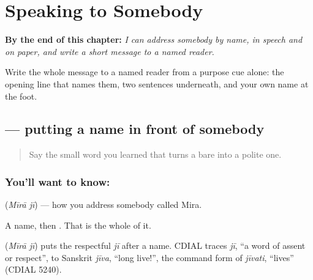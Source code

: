 
\chapter{Speaking to Somebody}
\label{ch:hi-sambodhan}

\begin{chapteropening}
\textbf{By the end of this chapter:} \emph{I can address somebody by name, in speech and on paper, and write a short message to a named reader.}

Write the whole message to a named reader from a purpose cue alone: the opening line that names them, two sentences underneath, and your own name at the foot.
\end{chapteropening}

\section[\texorpdfstring{\hi{मीरा} \hi{जी} (Mīrā jī)}{मीरा जी (Mīrā jī)}]{  — putting a name in front of somebody}

\label{lesson:HI-C97-naam-ji}



\begin{quote}
Say the small word you learned that turns a bare \textbf{} into a polite one.
\end{quote}

\subsection*{You'll want to know:  }
\textbf{ } (\emph{Mīrā jī}) — how you address somebody called Mira.

A name, then \textbf{}. That is the whole of it.

\begin{cousinweb}
\textbf{ } (\emph{Mīrā jī}) puts the respectful \emph{jī} after a name. CDIAL traces \emph{jī}, \textquotedblleft{}a word of assent or respect\textquotedblright{}, to Sanskrit \emph{jīva}, \textquotedblleft{}long live!\textquotedblright{}, the command form of \emph{jīvati}, \textquotedblleft{}lives\textquotedblright{} (CDIAL 5240).
\end{cousinweb}

